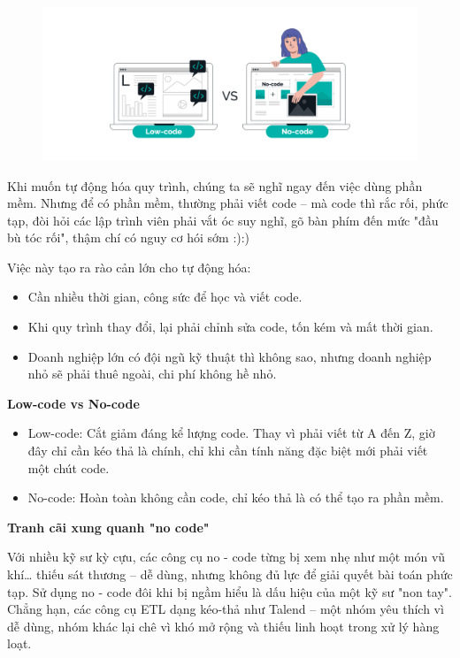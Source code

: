 \begin{figure}[htbp]
    \centering
    \includegraphics[width=1\linewidth]{Chap1-7/cover-Low-Code.pdf}
\end{figure}

Khi muốn tự động hóa quy trình, chúng ta sẽ nghĩ ngay đến việc dùng phần mềm. Nhưng để có phần mềm, thường phải viết code – mà code thì rắc rối, phức tạp, đòi hỏi các lập trình viên phải vắt óc suy nghĩ, gõ bàn phím đến mức "đầu bù tóc rối", thậm chí có nguy cơ hói sớm :):)

\newpage
Việc này tạo ra rào cản lớn cho tự động hóa:
\begin{itemize}
    \item Cần nhiều thời gian, công sức để học và viết code.

    \item Khi quy trình thay đổi, lại phải chỉnh sửa code, tốn kém và mất thời gian.

    \item Doanh nghiệp lớn có đội ngũ kỹ thuật thì không sao, nhưng doanh nghiệp nhỏ sẽ phải thuê ngoài, chi phí không hề nhỏ.
\end{itemize}

\textbf{Low-code vs No-code}
\begin{itemize}
    \item Low-code: Cắt giảm đáng kể lượng code. Thay vì phải viết từ A đến Z, giờ đây chỉ cần kéo thả là chính, chỉ khi cần tính năng đặc biệt mới phải viết một chút code.

    \item No-code: Hoàn toàn không cần code, chỉ kéo thả là có thể tạo ra phần mềm.
\end{itemize}

\textbf{Tranh cãi xung quanh "no code"}

Với nhiều kỹ sư kỳ cựu, các công cụ no - code từng bị xem nhẹ như một món vũ khí… thiếu sát thương – dễ dùng, nhưng không đủ lực để giải quyết bài toán phức tạp. Sử dụng no - code đôi khi bị ngầm hiểu là dấu hiệu của một kỹ sư "non tay". Chẳng hạn, các công cụ ETL dạng kéo-thả như Talend – một nhóm yêu thích vì dễ dùng, nhóm khác lại chê vì khó mở rộng và thiếu linh hoạt trong xử lý hàng loạt.


